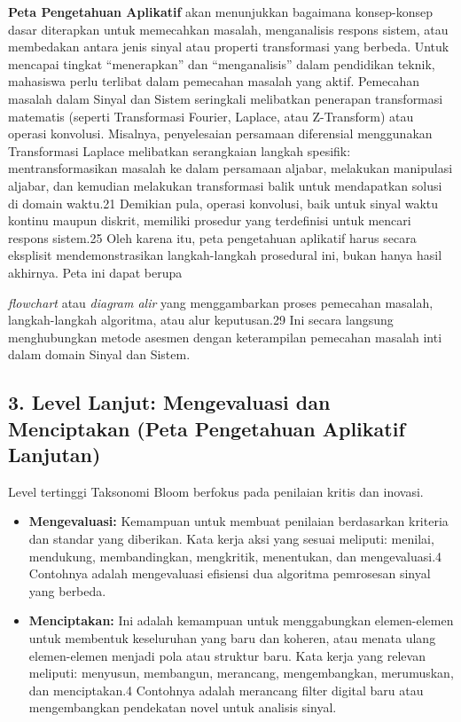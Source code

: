\documentclass[
  letterpaper,
  DIV=11,
  numbers=noendperiod]{scrreprt}
\begin{document}
\textbf{Peta Pengetahuan Aplikatif} akan menunjukkan bagaimana
konsep-konsep dasar diterapkan untuk memecahkan masalah, menganalisis
respons sistem, atau membedakan antara jenis sinyal atau properti
transformasi yang berbeda. Untuk mencapai tingkat ``menerapkan'' dan
``menganalisis'' dalam pendidikan teknik, mahasiswa perlu terlibat dalam
pemecahan masalah yang aktif. Pemecahan masalah dalam Sinyal dan Sistem
seringkali melibatkan penerapan transformasi matematis (seperti
Transformasi Fourier, Laplace, atau Z-Transform) atau operasi konvolusi.
Misalnya, penyelesaian persamaan diferensial menggunakan Transformasi
Laplace melibatkan serangkaian langkah spesifik: mentransformasikan
masalah ke dalam persamaan aljabar, melakukan manipulasi aljabar, dan
kemudian melakukan transformasi balik untuk mendapatkan solusi di domain
waktu.21 Demikian pula, operasi konvolusi, baik untuk sinyal waktu
kontinu maupun diskrit, memiliki prosedur yang terdefinisi untuk mencari
respons sistem.25 Oleh karena itu, peta pengetahuan aplikatif harus
secara eksplisit mendemonstrasikan langkah-langkah prosedural ini, bukan
hanya hasil akhirnya. Peta ini dapat berupa

\emph{flowchart} atau \emph{diagram alir} yang menggambarkan proses
pemecahan masalah, langkah-langkah algoritma, atau alur keputusan.29 Ini
secara langsung menghubungkan metode asesmen dengan keterampilan
pemecahan masalah inti dalam domain Sinyal dan Sistem.

\subsection{3. Level Lanjut: Mengevaluasi dan Menciptakan (Peta
Pengetahuan Aplikatif
Lanjutan)}\label{level-lanjut-mengevaluasi-dan-menciptakan-peta-pengetahuan-aplikatif-lanjutan}

Level tertinggi Taksonomi Bloom berfokus pada penilaian kritis dan
inovasi.

\begin{itemize}
\item
  \textbf{Mengevaluasi:} Kemampuan untuk membuat penilaian berdasarkan
  kriteria dan standar yang diberikan. Kata kerja aksi yang sesuai
  meliputi: menilai, mendukung, membandingkan, mengkritik, menentukan,
  dan mengevaluasi.4 Contohnya adalah mengevaluasi efisiensi dua
  algoritma pemrosesan sinyal yang berbeda.
\item
  \textbf{Menciptakan:} Ini adalah kemampuan untuk menggabungkan
  elemen-elemen untuk membentuk keseluruhan yang baru dan koheren, atau
  menata ulang elemen-elemen menjadi pola atau struktur baru. Kata kerja
  yang relevan meliputi: menyusun, membangun, merancang, mengembangkan,
  merumuskan, dan menciptakan.4 Contohnya adalah merancang filter
  digital baru atau mengembangkan pendekatan novel untuk analisis
  sinyal.
\end{itemize}
\end{document}
